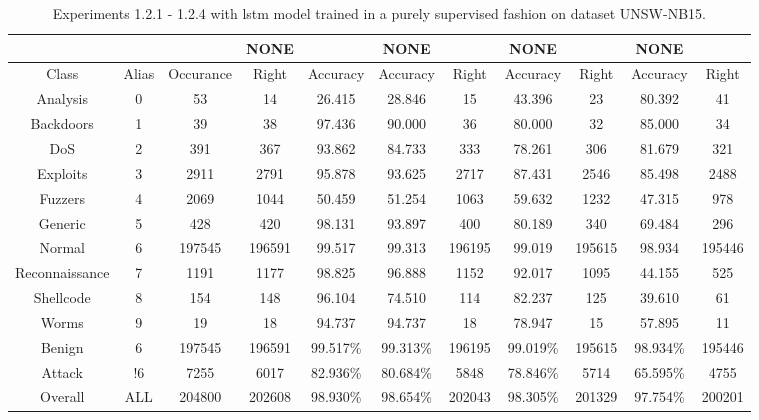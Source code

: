 \begin{table}[htb]
    \centering
    \caption{Experiments 1.2.1 - 1.2.4 with \gls{lstm} model trained in a purely supervised fashion on dataset UNSW-NB15.}
    \label{table:results:lstm:flows15_supervised}
    \begin{tabular}{@{}ccccccccccc@{}}
        \toprule
         &  &  & NONE &  & NONE &  & NONE &  & NONE &  \\
        \midrule
        Class &  Alias &  Occurance &  Right &  Accuracy &  Accuracy &  Right &  Accuracy &  Right &  Accuracy &  Right \\
        Analysis &  0 &  53 &  14 &  26.415 &  28.846 &  15 &  43.396 &  23 &  80.392 &  41 \\
        Backdoors &  1 &  39 &  38 &  97.436 &  90.000 &  36 &  80.000 &  32 &  85.000 &  34 \\
        DoS &  2 &  391 &  367 &  93.862 &  84.733 &  333 &  78.261 &  306 &  81.679 &  321 \\
        Exploits &  3 &  2911 &  2791 &  95.878 &  93.625 &  2717 &  87.431 &  2546 &  85.498 &  2488 \\
        Fuzzers &  4 &  2069 &  1044 &  50.459 &  51.254 &  1063 &  59.632 &  1232 &  47.315 &  978 \\
        Generic &  5 &  428 &  420 &  98.131 &  93.897 &  400 &  80.189 &  340 &  69.484 &  296 \\
        Normal &  6 &  197545 &  196591 &  99.517 &  99.313 &  196195 &  99.019 &  195615 &  98.934 &  195446 \\
        Reconnaissance &  7 &  1191 &  1177 &  98.825 &  96.888 &  1152 &  92.017 &  1095 &  44.155 &  525 \\
        Shellcode &  8 &  154 &  148 &  96.104 &  74.510 &  114 &  82.237 &  125 &  39.610 &  61 \\
        Worms &  9 &  19 &  18 &  94.737 &  94.737 &  18 &  78.947 &  15 &  57.895 &  11 \\
        Benign &  6 &  197545 &  196591 &  99.517\% &  99.313\% &  196195 &  99.019\% &  195615 &  98.934\% &  195446 \\
        Attack &  !6 &  7255 &  6017 &  82.936\% &  80.684\% &  5848 &  78.846\% &  5714 &  65.595\% &  4755 \\
        Overall &  ALL &  204800 &  202608 &  98.930\% &  98.654\% &  202043 &  98.305\% &  201329 &  97.754\% &  200201 \\
        \bottomrule
    \end{tabular}
\end{table}